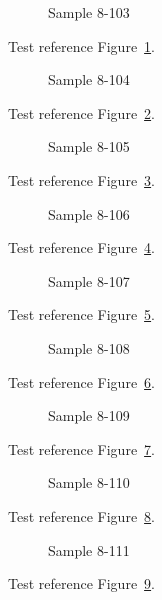 \begin{figure}[tbhp]
\caption{Sample 8-103}
\label{fig:sample-8-103}
\end{figure}

Test reference Figure~\ref{fig:sample-8-103}.

\begin{figure}[tbhp]
\caption{Sample 8-104}
\label{fig:sample-8-104}
\end{figure}

Test reference Figure~\ref{fig:sample-8-104}.

\begin{figure}[tbhp]
\caption{Sample 8-105}
\label{fig:sample-8-105}
\end{figure}

Test reference Figure~\ref{fig:sample-8-105}.

\begin{figure}[tbhp]
\caption{Sample 8-106}
\label{fig:sample-8-106}
\end{figure}

Test reference Figure~\ref{fig:sample-8-106}.

\begin{figure}[tbhp]
\caption{Sample 8-107}
\label{fig:sample-8-107}
\end{figure}

Test reference Figure~\ref{fig:sample-8-107}.

\begin{figure}[tbhp]
\caption{Sample 8-108}
\label{fig:sample-8-108}
\end{figure}

Test reference Figure~\ref{fig:sample-8-108}.

\begin{figure}[tbhp]
\caption{Sample 8-109}
\label{fig:sample-8-109}
\end{figure}

Test reference Figure~\ref{fig:sample-8-109}.

\begin{figure}[tbhp]
\caption{Sample 8-110}
\label{fig:sample-8-110}
\end{figure}

Test reference Figure~\ref{fig:sample-8-110}.

\begin{figure}[tbhp]
\caption{Sample 8-111}
\label{fig:sample-8-111}
\end{figure}

Test reference Figure~\ref{fig:sample-8-111}.

